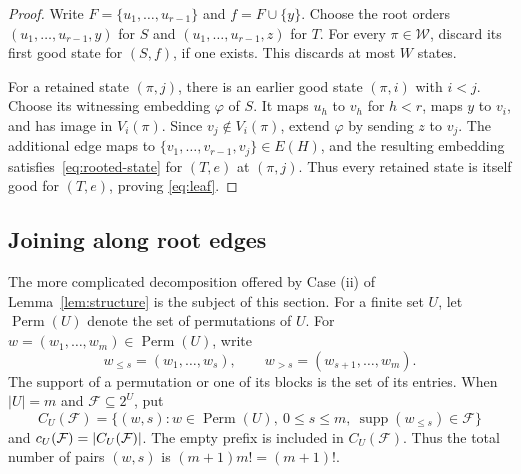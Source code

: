 \documentclass[11pt]{article}
\theoremstyle{remark}
\numberwithin{equation}{section}
\DeclareMathOperator{\Perm}{Perm}
\DeclareMathOperator{\supp}{supp}
\newcommand{\Wcal}{\mathcal W}
\begin{document}
	\begin{proof}
		Write $F=\{u_1,\ldots,u_{r-1}\}$ and $f=F\cup\{y\}$.
		Choose the root orders $(u_1,\ldots,u_{r-1},y)$ for $S$ and
		$(u_1,\ldots,u_{r-1},z)$ for $T$.
		For every $\pi\in\Wcal$, discard its first good state for
		$(S,f)$, if one exists. This discards at most $W$ states.
		
		
		For a retained state $(\pi,j)$, there is an earlier good state
		$(\pi,i)$ with $i<j$. Choose its witnessing embedding $\varphi$
		of $S$. It maps $u_h$ to $v_h$ for $h<r$, maps $y$ to $v_i$,
		and has image in $V_i(\pi)$. Since $v_j\notin V_i(\pi)$, extend
		$\varphi$ by sending $z$ to $v_j$. The additional edge maps to
		$\{v_1,\ldots,v_{r-1},v_j\}\in E(H)$, and the resulting embedding
		satisfies~\eqref{eq:rooted-state} for $(T,e)$ at $(\pi,j)$.
		Thus every retained state is itself good for $(T,e)$, proving
		\eqref{eq:leaf}.
	\end{proof}
	
	
	\subsection{Joining along root edges}\label{subsec:operationsroot}
	
	
	
	
	The more complicated decomposition offered by Case (ii) of Lemma~\ref{lem:structure} is the subject of this section.
	For a finite set $U$, let $\Perm(U)$ denote the set of
	permutations of $U$. For $w=(w_1,\ldots,w_m)\in\Perm(U)$,
	write
	\[
	w_{\le s}=(w_1,\ldots,w_s),
	\qquad
	w_{>s}=(w_{s+1},\ldots,w_m).
	\]
	The support of a permutation or one of its blocks is
	the set of its entries. When $|U|=m$ and $\mathcal F\subseteq2^U$, put
	\[
	C_U(\mathcal F)=\{(w,s):w\in\Perm(U),\ 0\le s\le m,
	\ \supp(w_{\le s})\in\mathcal F\}\]  and  $c_U({\cal F})=|C_U({\cal F})|$.
	The empty prefix is included in $C_U(\mathcal F)$. Thus the total number of pairs
	$(w,s)$ is $(m+1)m!=(m+1)!$. 
	
\end{document}

